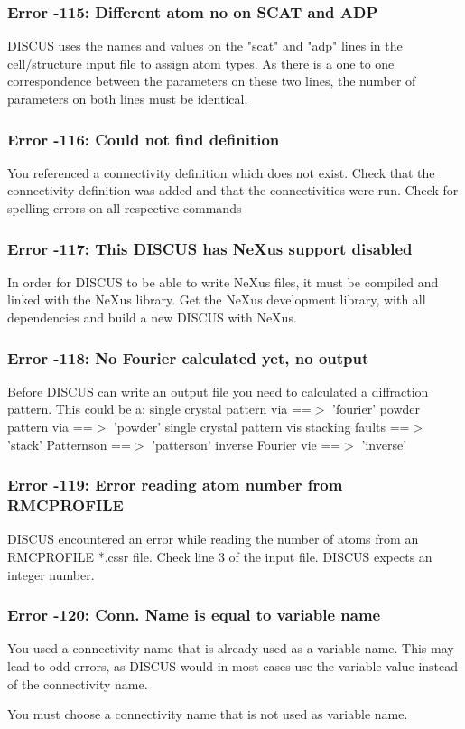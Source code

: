 \subsubsection{Error -115: Different atom no on SCAT and ADP}
\par
DISCUS uses the names and values on the "scat" and "adp" lines in the 
cell/structure input file to assign atom types. As there is a one to one 
correspondence between the parameters on these two lines, the number of 
parameters on both lines must be identical. 
\subsubsection{Error -116: Could not find definition}
\par
You referenced a connectivity definition which does not exist. 
Check that the connectivity definition was added and that the 
connectivities were run. 
Check for spelling errors on all respective commands 
\subsubsection{Error -117: This DISCUS has NeXus support disabled}
\par
In order for DISCUS to be able to write NeXus files, it must be compiled 
and linked with the NeXus library. 
Get the NeXus development library, with all dependencies and build a 
new DISCUS with NeXus. 
\subsubsection{Error -118: No Fourier calculated yet, no output}
\par
Before DISCUS can write an output file you need to calculated a diffraction 
pattern. This could be a: 
single crystal pattern via ==$> $ 'fourier' 
powder pattern via ==$> $ 'powder' 
single crystal pattern vis stacking faults ==$> $ 'stack' 
Patternson ==$> $ 'patterson' 
inverse Fourier vie ==$> $ 'inverse' 
\subsubsection{Error -119: Error reading atom number from RMCPROFILE}
\par
DISCUS encountered an error while reading the number of atoms from 
an RMCPROFILE *.cssr file. 
Check line 3 of the input file. DISCUS expects an integer number. 
\subsubsection{Error -120: Conn. Name is equal to variable name}
\par
You used a connectivity name that is already used as a 
variable name. This may lead to odd errors, as DISCUS would in most 
cases use the variable value instead of the connectivity name. 
\par
You must choose a connectivity name that is not used as variable name. 
